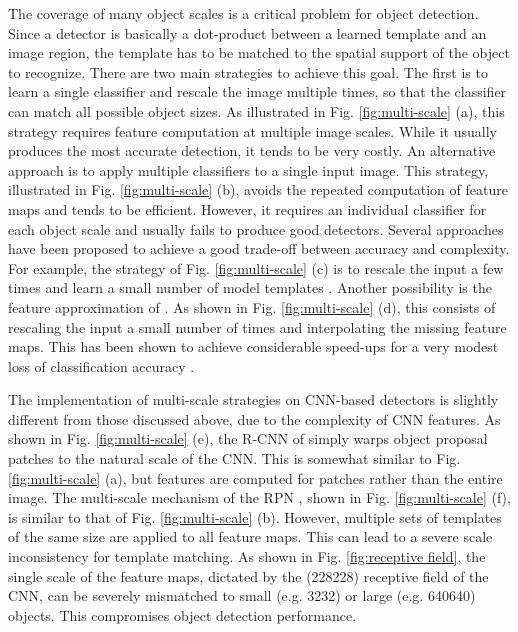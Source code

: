 \documentclass[runningheads]{llncs}
\begin{document}
The coverage of many object scales is a critical problem for object
detection. Since a detector is basically a dot-product between a learned
template and an image region, the template has to be matched to the
spatial support of the object to recognize. There are two main strategies
to achieve this goal. The first is to learn a single classifier and
rescale the image multiple times, so that the classifier can match all
possible object sizes. As illustrated in Fig. \ref{fig:multi-scale} (a),
this strategy requires feature computation at multiple image scales.
While it usually produces the most accurate detection, it tends to
be very costly. An alternative approach is to apply multiple classifiers
to a single input image. This strategy, illustrated in
Fig. \ref{fig:multi-scale} (b), avoids the repeated computation of feature
maps and tends to be efficient. However, it requires an individual classifier
for each object scale and usually fails to produce good detectors.
Several approaches have been proposed to achieve a good trade-off between
accuracy and complexity. For example, the strategy of
Fig. \ref{fig:multi-scale} (c) is to rescale the input a few times and learn
a small number of model templates \cite{DBLP:conf/cvpr/BenensonMTG12}. Another
possibility is the feature approximation
of \cite{DBLP:journals/pami/DollarABP14}. As shown in
Fig. \ref{fig:multi-scale} (d), this consists of rescaling the input a small
number of times and interpolating the missing feature maps. This
has been shown to achieve considerable speed-ups for a very modest loss of
classification accuracy \cite{DBLP:journals/pami/DollarABP14}.

The implementation of multi-scale strategies on CNN-based detectors is
slightly different from those discussed above, due to the complexity of CNN
features. As shown in Fig. \ref{fig:multi-scale} (e), the R-CNN of
\cite{DBLP:conf/cvpr/GirshickDDM14} simply warps object proposal patches to
the natural scale of the CNN. This is somewhat similar to Fig.
\ref{fig:multi-scale} (a), but features are computed for patches rather
than the entire image. The multi-scale mechanism of the
RPN \cite{DBLP:conf/nips/shaoqing15fasterRcnn}, shown in
Fig. \ref{fig:multi-scale} (f), is similar to that of
Fig. \ref{fig:multi-scale} (b). However, multiple sets of templates of the
same size are applied to all feature maps. This can lead to a
severe scale inconsistency for template matching. As shown
in Fig. \ref{fig:receptive field}, the single scale of the feature maps,
dictated by the (228228) receptive field of the CNN, can be
severely mismatched to small (e.g. 3232) or large
(e.g. 640640) objects. This compromises object detection
performance.
\end{document}
